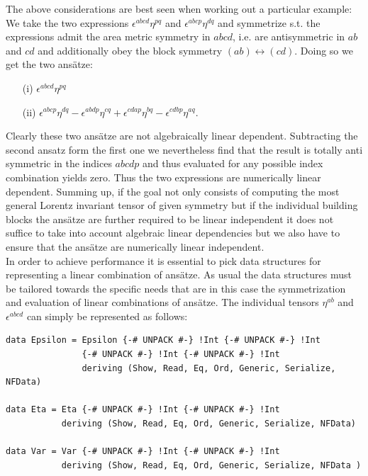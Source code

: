 \documentclass[a4paper,12pt, DIV=14, BCOR=5mm, twoside, headsepline]{scrbook}
\begin{document}
The above considerations are best seen when working out a particular example: We take the two expressions $\epsilon^{abcd} \eta^{pq}$ and $\epsilon^{abcp} \eta^{dq}$ and symmetrize s.t. the expressions admit the area metric symmetry in $abcd$, i.e. are antisymmetric in $ab$ and $cd$ and additionally obey the block symmetry $(ab) \leftrightarrow (cd)$. Doing so we get the two ansätze: 
\begin{itemize}
\item[(i)] $\epsilon^{abcd} \eta^{pq}$ 
\item[(ii)] $\epsilon^{abcp} \eta^{dq} - \epsilon^{abdp} \eta^{cq} + \epsilon^{cdap} \eta^{bq} - \epsilon^{cdbp} \eta^{aq}$.
\end{itemize}
Clearly these two ansätze are not algebraically linear dependent. Subtracting the second ansatz form the first one we nevertheless find that the result is totally anti symmetric in the indices $abcdp$ and thus evaluated for any possible index combination yields zero. Thus the two expressions are numerically linear dependent. Summing up, if the goal not only consists of computing the most general Lorentz invariant tensor of given symmetry but if the individual building blocks the ansätze are further required to be linear independent it does not suffice to take into account algebraic linear dependencies but we also have to ensure that the ansätze are numerically linear independent.  \\

In order to achieve performance it is essential to pick data structures for representing a linear combination of ansätze. As usual the data structures must be tailored towards the specific needs that are in this case the symmetrization and evaluation of linear combinations of ansätze. 
The individual tensors $\eta^{ab}$ and $\epsilon^{abcd}$ can simply be represented as follows:

\begin{samepage} 
\begin{verbatim}
data Epsilon = Epsilon {-# UNPACK #-} !Int {-# UNPACK #-} !Int
               {-# UNPACK #-} !Int {-# UNPACK #-} !Int
               deriving (Show, Read, Eq, Ord, Generic, Serialize, NFData)

data Eta = Eta {-# UNPACK #-} !Int {-# UNPACK #-} !Int 
           deriving (Show, Read, Eq, Ord, Generic, Serialize, NFData)

data Var = Var {-# UNPACK #-} !Int {-# UNPACK #-} !Int 
           deriving (Show, Read, Eq, Ord, Generic, Serialize, NFData )
\end{verbatim} 
\end{samepage}
\end{document}
